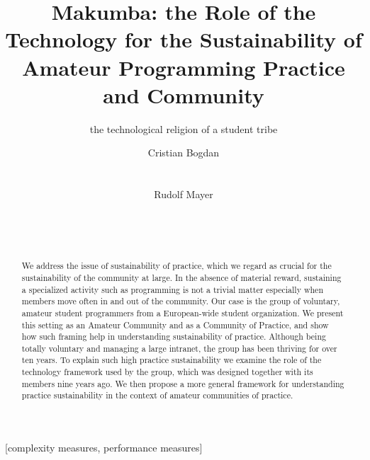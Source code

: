 \documentclass{acm_proc_article-sp}
\begin{document}
\title{Makumba: the Role of the Technology for the Sustainability of Amateur Programming Practice and Community}
\subtitle{the technological religion of a student tribe}

\author{
\alignauthor
Cristian Bogdan\\
       \\
       \\
\alignauthor
Rudolf Mayer\\
       \\
       \\
       \\
}

\maketitle
\begin{abstract}
We address the issue of sustainability of practice, which we regard as crucial for the sustainability of the community at large. In the absence of material reward, sustaining a specialized activity such as programming is not a trivial matter especially when members move often in and out of the community. Our case is the group of voluntary, amateur student programmers from a European-wide student organization. We present this setting as an Amateur Community and as a Community of Practice, and show how such framing help in understanding sustainability of practice. Although being totally voluntary and managing a large intranet, the group has been thriving for over ten years. To explain such high practice sustainability we examine the role of the technology framework used by the group, which was designed together with its members nine years ago. We then propose a more general framework for understanding practice sustainability in the context of amateur communities of practice. 
\end{abstract}

[complexity measures, performance measures]
\end{document}
